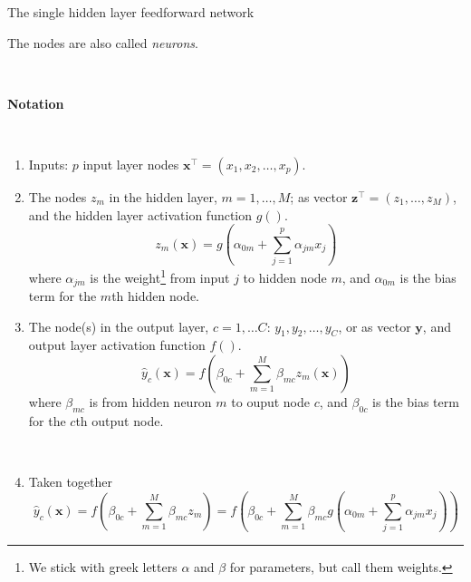 \documentclass[
  10pt,
  ignorenonframetext,
]{beamer}
\providecommand{\tightlist}{%
  \setlength{\itemsep}{0pt}\setlength{\parskip}{0pt}}
\begin{document}
\begin{frame}
\begin{block}{The single hidden layer feedforward network}
\protect\hypertarget{the-single-hidden-layer-feedforward-network}{}
\(~\)

The nodes are also called \emph{neurons}.

\(~\)

\textbf{Notation}

\(~\)

\begin{enumerate}
\tightlist
\item
  Inputs: \(p\) input layer nodes
  \({\boldsymbol{x}^\top} = (x_1, x_2, \ldots, x_p)\).
\item
  The nodes \(z_m\) in the hidden layer, \(m=1,\ldots, M\); as vector
  \({\boldsymbol z}^\top=(z_1, \ldots, z_M)\), and the hidden layer
  activation function \(g()\). \[
  z_m({\boldsymbol x})=g(\alpha_{0m}+\sum_{j=1}^p \alpha_{jm}x_{j})
  \] where \(\alpha_{jm}\) is the
  weight\footnote{We stick with greek letters $\alpha$ and $\beta$ for parameters, but call them weights.}
  from input \(j\) to hidden node \(m\), and \(\alpha_{0m}\) is the bias
  term for the \(m\)th hidden node.
\end{enumerate}
\end{block}
\end{frame}

\begin{frame}
\begin{enumerate}
\setcounter{enumi}{2}
\tightlist
\item
  The node(s) in the output layer, \(c=1,\ldots C\):
  \(y_1, y_2, \ldots, y_C\), or as vector \({\boldsymbol y}\), and
  output layer activation function \(f()\). \[
  \hat{y}_c({\boldsymbol x})=f(\beta_{0c}+\sum_{m=1}^M \beta_{mc}z_{m}({\boldsymbol x}))
  \] where \(\beta_{mc}\) is from hidden neuron \(m\) to ouput node
  \(c\), and \(\beta_{0c}\) is the bias term for the \(c\)th output
  node.
\end{enumerate}

\(~\)

\begin{enumerate}
\setcounter{enumi}{3}
\tightlist
\item
  Taken together \[
  \hat{y}_c({\boldsymbol x})=f(\beta_{0c}+\sum_{m=1}^M \beta_{mc}z_{m})=f(\beta_{0c}+\sum_{m=1}^M \beta_{mc}g(\alpha_{0m}+\sum_{j=1}^p \alpha_{jm}x_{j}))
  \]
\end{enumerate}
\end{frame}
\end{document}
